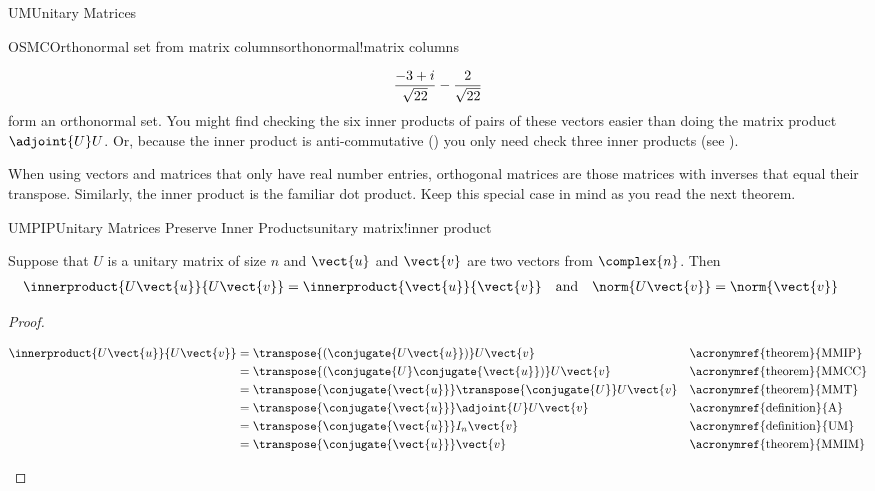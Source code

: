 \begin{subsect}{UM}{Unitary Matrices}
\begin{example}{OSMC}{Orthonormal set from matrix columns}{orthonormal!matrix columns}
\begin{para}
\begin{equation*}
{{   \frac{-3 + i }{{\sqrt{22}}}\\
   -\frac{2}{\sqrt{22}}
}
%
}
\end{equation*}
%
form an orthonormal set.  You might find checking the six inner products of pairs of these vectors easier than doing the matrix product $\adjoint{U}U$.  Or, because the inner product is anti-commutative () you only need check  three inner products (see ).\end{para}
%
\end{example}
%
\begin{para}When using vectors and matrices that only have real number entries, orthogonal matrices are those matrices with inverses that equal their transpose.  Similarly, the inner product is the familiar dot product.  Keep this special case in mind as you read the next theorem.\end{para}
%
\begin{theorem}{UMPIP}{Unitary Matrices Preserve Inner Products}{unitary matrix!inner product}
\begin{para}Suppose that $U$ is a unitary matrix of size $n$ and $\vect{u}$ and $\vect{v}$ are two vectors from $\complex{n}$.  Then
%
\begin{align*}
\innerproduct{U\vect{u}}{U\vect{v}}&=\innerproduct{\vect{u}}{\vect{v}}
&
&\text{and}
&
\norm{U\vect{v}}&=\norm{\vect{v}}
\end{align*}
\end{para}
%
\end{theorem}
%
\begin{proof}
%
\begin{para}\begin{align*}
\innerproduct{U\vect{u}}{U\vect{v}}
&=\transpose{\left(\conjugate{U\vect{u}}\right)}U\vect{v}
&&\text{\acronymref{theorem}{MMIP}}\\
%
&=\transpose{\left(\conjugate{U}\conjugate{\vect{u}}\right)}U\vect{v}
&&\text{\acronymref{theorem}{MMCC}}\\
%
&=\transpose{\conjugate{\vect{u}}}\transpose{\conjugate{U}}U\vect{v}
&&\text{\acronymref{theorem}{MMT}}\\
%
&=\transpose{\conjugate{\vect{u}}}\adjoint{U}U\vect{v}
&&\text{\acronymref{definition}{A}}\\
%
&=\transpose{\conjugate{\vect{u}}}I_n\vect{v}
&&\text{\acronymref{definition}{UM}}\\
%
&=\transpose{\conjugate{\vect{u}}}\vect{v}
&&\text{\acronymref{theorem}{MMIM}}\\

\end{align*}
\end{para}
\end{proof}
\end{subsect}
